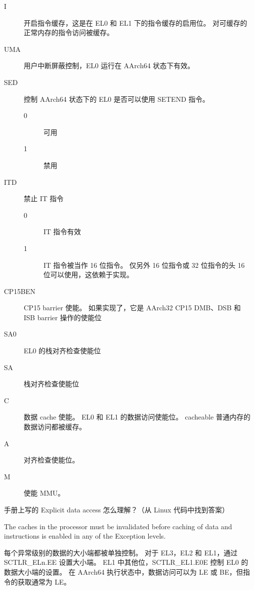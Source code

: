 \begin{description}
  \item[I] 开启指令缓存，这是在 EL0 和 EL1 下的指令缓存的启用位。
    对可缓存的正常内存的指令访问被缓存。
  \item[UMA] 用户中断屏蔽控制，EL0 运行在 AArch64 状态下有效。
  \item[SED] 控制 AArch64 状态下的 EL0 是否可以使用 SETEND 指令。
    \begin{description}
      \item[0] 可用
      \item[1] 禁用
    \end{description}
  \item[ITD] 禁止 IT 指令
    \begin{description}
      \item[0] IT 指令有效
      \item[1] IT 指令被当作 16 位指令。
        仅另外 16 位指令或 32 位指令的头 16 位可以使用，这依赖于实现。
    \end{description}
  \item[CP15BEN] CP15 barrier 使能。
    如果实现了，它是 AArch32 CP15 DMB、DSB 和 ISB barrier 操作的使能位
  \item[SA0] EL0 的栈对齐检查使能位
  \item[SA] 栈对齐检查使能位
  \item[C] 数据 cache 使能。
    EL0 和 EL1 的数据访问使能位。
    cacheable 普通内存的数据访问都被缓存。
  \item[A] 对齐检查使能位。
  \item[M] 使能 MMU。
\end{description}

\begin{probsolu}[title={Problem and Solution \theprob}]{
    手册上写的 Explicit data access 怎么理解？（从 Linux 代码中找到答案）}

\end{probsolu}

\begin{remark}
  The caches in the processor must be invalidated before caching of data and instructions is
enabled in any of the Exception levels.
\end{remark}


每个异常级别的数据的大小端都被单独控制。
对于 EL3，EL2 和 EL1，通过 SCTLR\_ELn.EE 设置大小端。
EL1 中其他位，SCTLR\_EL1.E0E 控制 EL0 的数据大小端的设置。
在 AArch64 执行状态中，数据访问可以为 LE 或 BE，但指令的获取通常为 LE。

